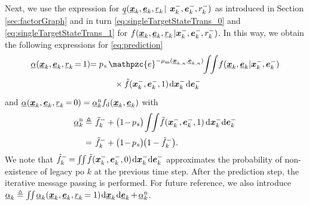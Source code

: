 \documentclass[10pt, twoside, romanappendices]{IEEEtran}
\providecommand{\ist}{\hspace*{.3mm}}
\providecommand{\rmv}{\hspace*{-.3mm}}
\providecommand{\nn}{\nonumber}
\begin{document}
Next, we use the expression for $\underline{q}( \underline{\V{x}}_{k}, \underline{\V{e}}_{k},  \underline{r}_{k} \ist |$ $\bm{x}^{-}_{k}, \bm{e}^{-}_{k}, r^{-}_{k})$ as introduced in Section \ref{sec:factorGraph} and in turn \eqref{eq:singleTargetStateTrans_0} and \eqref{eq:singleTargetStateTrans_1} for $f( \underline{\V{x}}_{k}, \underline{\V{e}}_{k},  \underline{r}_{k} \ist | \V{x}^{-}_{k}, \V{e}^{-}_{k}, r^{-}_{k})$. In this way, we obtain the following expressions for \eqref{eq:prediction}
\begin{align}
\underline{\alpha}(\underline{\V{x}}_{k},\underline{\V{e}}_{k}, \underline{r}_{k} \rmv=\rmv 1)&\hspace{-1mm}= p_{\ist\mathrm{s}} \ist\ist \mathpzc{e}^{-\mu_{\mathrm{m}}(\underline{\V{x}}_{k,n},\underline{\V{e}}_{k,n})} \rmv\rmv\rmv  \int \rmv\rmv\rmv\rmv \int \rmv\rmv f( \underline{\V{x}}_{k}, \underline{\V{e}}_{k}  | \V{x}^{-}_{k}, \V{e}^{-}_{k}) \nn\\[.8mm]
&\hspace{10mm}\times\tilde{f}(\V{x}^{-}_{k}, \V{e}^{-}_{k}, 1) \ist \mathrm{d}\V{x}^{-}_{k} \ist \mathrm{d}\V{e}^{-}_{k}  \rmv \label{eq:alpha1}  \\[0mm]
\nn\\[-10mm]
\nn
\end{align}
and $\underline{\alpha}(\underline{\V{x}}_{k}, \underline{\V{e}}_{k}, \underline{r}_{k} \rmv=\rmv 0) = \underline{\alpha}^{\mathrm{n}}_k f_{\mathrm{d}}(\underline{\V{x}}_{k}, \underline{\V{e}}_{k})$ with
\begin{align}
\underline{\alpha}^{\mathrm{n}}_k &\triangleq\ist \tilde{f}^{-}_{k}  + \big(1\!-\rmv p_{\ist\mathrm{s}}\big) \rmv \int \rmv\rmv\rmv\rmv \int \! \tilde{f}(\V{x}^{-}_{k},\V{e}^{-}_{k},1) 
\,\mathrm{d}\V{x}^{-}_{k} \mathrm{d}\V{e}^{-}_{k}\nn\\[1mm]
&=\ist \tilde{f}^{-}_{k}  + \big(1\!-\rmv p_{\ist\mathrm{s}}\big) \rmv \big( 1- \tilde{f}^{-}_{k} \big).
\label{eq:alpha0}
\end{align}
We note that $\tilde{f}^{-}_{k} \rmv=\rmv \int \rmv\rmv\rmv\rmv \int \rmv\tilde{f}(\V{x}^{-}_{k}, \V{e}^{-}_{k}, 0) \ist \mathrm{d} \V{x}^{-}_{k} \mathrm{d}\V{e}^{-}_{k}$ approximates the probability of non-existence of legacy \ac{po} $k$ at the previous time step. After the prediction step, the iterative message passing is performed. For future reference, we also introduce $\underline{\alpha}_{k} \triangleq \int \rmv\rmv\rmv\rmv \int \rmv \underline{\alpha}_{k}(\underline{\V{x}}_{k}, \underline{\V{e}}_{k}, \underline{r}_{k} \rmv= 1) \ist \mathrm{d} \underline{\V{x}}_{k} \ist \mathrm{d} \underline{\V{e}}_{k} \rmv+\rmv \underline{\alpha}^{\mathrm{n}}_{k}$.
\end{document}
